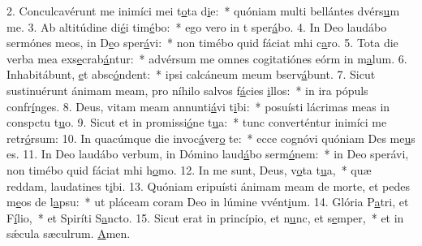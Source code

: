 2. Conculcavérunt me inimíci mei t\uline{o}ta d\uline{i}e:~* quóniam multi bellántes dvérs\uline{u}m me.
3. Ab altitúdine di\uline{é}i tim\uline{é}bo:~* ego vero in t sper\uline{á}bo.
4. In Deo laudábo sermónes meos, in D\uline{e}o sper\uline{á}vi:~* non timébo quid fáciat mhi c\uline{a}ro.
5. Tota die verba mea exs\uline{e}crab\uline{á}ntur:~* advérsum me omnes cogitatiónes eórm in m\uline{a}lum.
6. Inhabitábunt, \uline{e}t absc\uline{ó}ndent:~* ipsi calcáneum meum bserv\uline{á}bunt.
7. Sicut sustinuérunt ánimam meam, pro níhilo salvos f\uline{á}cies \uline{i}llos:~* in ira pópuls confr\uline{í}nges.
8. Deus, vitam meam annunti\uline{á}vi t\uline{i}bi:~* posuísti lácrimas meas in conspctu t\uline{u}o.
9. Sicut et in promissi\uline{ó}ne t\uline{u}a:~* tunc converténtur inimíci me retr\uline{ó}rsum:
10. In quacúmque die invoc\uline{á}ver\uline{o} te:~* ecce cognóvi quóniam Des me\uline{u}s es.
11. In Deo laudábo verbum, in Dómino laud\uline{á}bo serm\uline{ó}nem:~* in Deo sperávi, non timébo quid fáciat mhi h\uline{o}mo.
12. In me sunt, Deus, v\uline{o}ta t\uline{u}a,~* quæ reddam, laudatines t\uline{i}bi.
13. Quóniam eripuísti ánimam meam de morte, et pedes m\uline{e}os de l\uline{a}psu:~* ut pláceam coram Deo in lúmine vvént\uline{i}um.
14. Glória P\uline{a}tri, et F\uline{í}lio,~* et Spiríti S\uline{a}ncto.
15. Sicut erat in princípio, et n\uline{u}nc, et s\uline{e}mper,~* et in sǽcula sæculrum. \uline{A}men.
